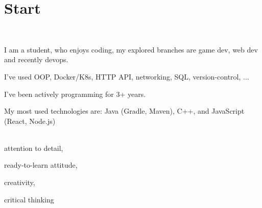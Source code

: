 \documentclass[pastel]{simplehipstercv}
\begin{document}
\pagestyle{empty}

\section*{Start}


\vspace{6em}

\setlength{\columnsep}{1cm}
\begin{paracol}{2}

    \footnotesize

    \flushleft

    \bigskip


    \bigskip


    \bigskip

    \\[0.5em]

    {\footnotesize
    I am a student, who enjoys coding, my explored branches are game dev, web dev and recently devops.

    I've used OOP, Docker/K8s, HTTP API, networking, SQL, version-control, ...

    I've been actively programming for 3+ years.

    My most used technologies are: Java (Gradle, Maven), C++, and JavaScript (React, Node.js)
    }

    \bigskip

    \\[0.5em]
    attention to detail,

    ready-to-learn attitude,

    creativity,

    critical thinking


\end{paracol}
\end{document}
